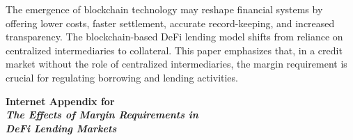 \documentclass[12pt]{article}
\begin{document}
The emergence of blockchain technology may reshape financial systems by offering lower costs, faster settlement, accurate record-keeping, and increased transparency. The blockchain-based DeFi lending model shifts from reliance on centralized intermediaries to collateral. This paper emphasizes that, in a credit market without the role of centralized intermediaries, the margin requirement is crucial for regulating borrowing and lending activities. 
 


\clearpage
\begin{singlespace}
%

%

\end{singlespace}







\newpage
\appendix
\setcounter{table}{0}
\renewcommand{\tablename}{Appendix Table}
\renewcommand{\figurename}{Appendix Figure}
\renewcommand{\thetable}{A\arabic{table}}
\setcounter{figure}{0}
\renewcommand{\thefigure}{A\arabic{figure}}
 

\newpage
\begin{center}
\textbf{{\LARGE Internet Appendix for}}
\\
\bigskip
\textbf{{\LARGE\textit{The Effects of Margin Requirements in \\DeFi Lending Markets}}}
\end{center}
 

\newpage

 


 
\end{document}
